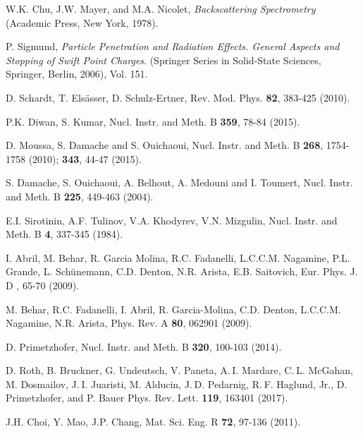 \documentclass[aps,pra,reprint,groupedaddress,showpacs,showkeys]{revtex4-1}
\begin{document}
\begin{thebibliography}{00}
W.K. Chu, J.W. Mayer, and M.A. Nicolet,
\textit{Backscattering Spectrometry}
(Academic Press, New York, 1978).

P. Sigmund, 
\textit{Particle Penetration and Radiation Effects. General Aspects and 
Stopping of Swift Point Charges}.
(Springer Series in Solid-State Sciences, Springer, Berlin, 2006), Vol. 151.

D. Schardt, T. Els\"asser, D. Schulz-Ertner, 
Rev. Mod. Phys. \textbf{82},  383-425 (2010).

P.K. Diwan, S. Kumar, 
Nucl. Instr. and Meth. B \textbf{359}, 78-84 (2015).

D. Moussa, S. Damache and S. Ouichaoui, 
Nucl. Instr. and Meth. B \textbf{268}, 1754-1758 (2010); 
\textbf{343},  44-47 (2015).

S. Damache, S. Ouichaoui, A. Belhout, A. Medouni and I. Toumert, 
Nucl. Instr. and Meth. B \textbf{225}, 449-463 (2004).

E.I. Sirotinin, A.F. Tulinov, V.A. Khodyrev, V.N. Mizgulin, 
Nucl. Instr. and Meth. B \textbf{4}, 337-345 (1984).

I. Abril, M. Behar, R. Garcia Molina, R.C. Fadanelli, L.C.C.M. Nagamine, 
P.L. Grande, L. Sch\"unemann, C.D. Denton, N.R. Arista, E.B. Saitovich,
Eur. Phys. J. D , 65-70 (2009).

M. Behar, R.C. Fadanelli, I. Abril, R. Garcia-Molina, C.D. Denton, 
L.C.C.M. Nagamine, N.R. Arista, 
Phys. Rev. A \textbf{80},  062901 (2009).

D. Primetzhofer, 
Nucl. Instr. and Meth. B \textbf{320}, 100-103 (2014).

D. Roth, B. Bruckner, G. Undeutsch, V. Paneta, A. I. Mardare, 
C. L. McGahan, M. Dosmailov, J. I. Juaristi, M. Alducin, 
J. D. Pedarnig, R. F. Haglund, Jr., D. Primetzhofer, and P. Bauer
Phys. Rev. Lett. \textbf{119}, 163401 (2017).

J.H. Choi, Y. Mao, J.P. Chang, 
Mat. Sci. Eng. R \textbf{72}, 97-136 (2011).


\end{thebibliography}
\end{document}

